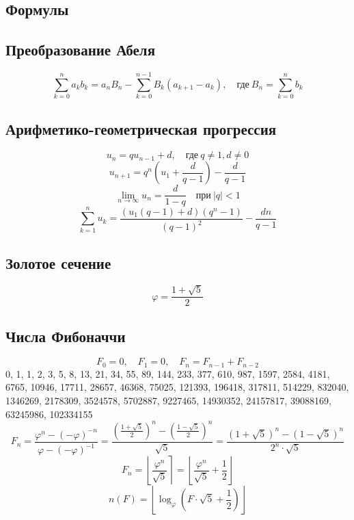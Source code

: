 \documentclass[11.5pt,a4paper,landscape,oneside]{amsart}
\newcommand{\Sequence}[1]{\subsection{#1}}
\newcommand{\Term}[1]{\subsection{#1}}
\begin{document}
\begin{multicols*}{2}
	\section{Формулы}
	\Term{Преобразование Абеля}
	\begin{equation}
		\sum_{k=0}^n a_k b_k=a_n B_n - \sum_{k=0}^{n-1} B_k (a_{k+1} - a_k),\quad\text{где}\ B_n = \sum_{k=0}^n b_k
	\end{equation}
	\Term{Арифметико-геометрическая прогрессия}
	\begin{equation}
		u_{n}=qu_{n-1}+d,\quad\text{где}\ q\ne 1, d\ne 0
	\end{equation}
	\begin{equation}
		u_{n+1} = q^{n}\left(u_{1}+\frac{d}{q-1}\right)- \frac{d}{q-1}
	\end{equation}
	\begin{equation}
		\lim\limits_{n\to\infty}u_{n}=\frac{d}{1-q}\quad\text{при}\ \lvert q\rvert<1
	\end{equation}
	\begin{equation}
		\sum_{k=1}^{n}u_{k} = \frac{(u_{1}(q-1)+d)(q^n-1)}{(q-1)^2}-\frac{dn}{q-1}
	\end{equation}
	\Term{Золотое сечение}
	\begin{equation}
		\varphi=\frac{1+\sqrt{5}}{2}
	\end{equation}
	\Sequence{Числа Фибоначчи}
	\begin{equation}
		F_0=0,\quad F_1=0,\quad F_{n}=F_{n-1}+F_{n-2}
	\end{equation}
	0, 1, 1, 2, 3, 5, 8, 13, 21, 34, 55, 89, 144, 233, 377, 610, 987, 1597, 2584, 4181, 6765, 10946, 17711, 28657, 46368, 75025, 121393, 196418, 317811, 514229, 832040, 1346269, 2178309, 3524578, 5702887, 9227465, 14930352, 24157817, 39088169, 63245986, 102334155
	\begin{equation}
		F_{n}=\frac{\varphi^n - (-\varphi)^{-n}}{\varphi - (-\varphi)^{-1}}=\frac{\left(\frac{1 + \sqrt{5}}{2}\right)^n - \left(\frac{1-\sqrt{5}}{2}\right)^n}{\sqrt{5}} = \frac{(1+\sqrt{5})^n-(1-\sqrt{5})^n}{2^n\cdot\sqrt{5}}
	\end{equation}
	\begin{equation}
		F_n = \left\lfloor\frac{\varphi^n}{\sqrt{5}}\right\rceil=\left\lfloor\frac{\varphi^n}{\sqrt{5}}+\frac{1}{2}\right\rfloor
	\end{equation}
	\begin{equation}
		n(F) = \left\lfloor \log_\varphi \left(F\cdot\sqrt{5} + \frac{1}{2}\right) \right\rfloor
	\end{equation}

\end{multicols*}
\end{document}
